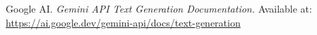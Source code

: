 \documentclass[a4paper,10pt]{article}
\begin{document}
\hfill \break


\begin{thebibliography}{1}

Google AI. \textit{Gemini API Text Generation Documentation.} 
Available at: \url{https://ai.google.dev/gemini-api/docs/text-generation}

\end{thebibliography}


	
	
%	
%	
%	
\end{document}
